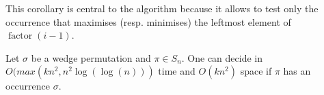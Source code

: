 \documentclass[a4paper]{llncs}
\DeclareMathOperator{\factor}{factor}
\begin{document}
This corollary is central to the algorithm because it allows to test only the occurrence that  maximises (resp. minimises) the leftmost element of $\factor(i-1)$.

%	
%
%
%	




\begin{proposition}
\label{Proposition:sigma avoids 213 and 231}
Let $\sigma$ be a wedge permutation and $\pi \in S_n$.
One can decide in $O(max(kn^2,n^2\log(\log(n)))$ time
and $O(kn^2)$ space if $\pi$ has an occurrence $\sigma$.
\end{proposition}
\end{document}
